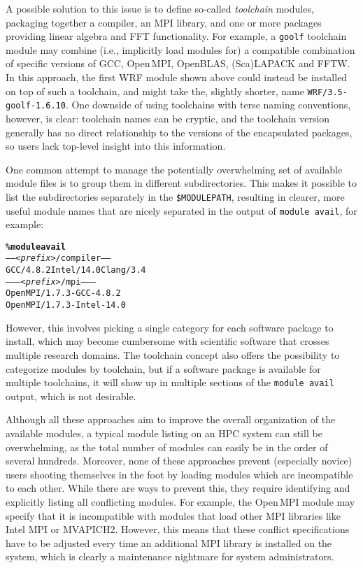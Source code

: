 A possible solution to this issue is to define so-called \emph{toolchain}
modules, packaging together a compiler, an MPI library, and one or more packages
providing linear algebra and FFT functionality. For example, a \texttt{\small goolf}
toolchain module may combine (i.e., implicitly load modules for) a compatible combination of specific versions of GCC,
Open\,MPI, OpenBLAS, (Sca)LAPACK and FFTW. In this approach, the
first WRF module shown above could instead be installed on top of such a toolchain,
and might take the, slightly shorter, name \texttt{\small WRF/3.5-goolf-1.6.10}.
One downside of using toolchains with terse naming conventions, however, is clear: toolchain names can be cryptic, and the toolchain version generally has no direct relationship to the versions of the encapsulated packages, so users lack top-level insight into 
this information.

One common attempt to manage the potentially overwhelming set of available
module files is to group them in different subdirectories. This makes 
it possible to list the subdirectories separately in the
\texttt{\small\$MODULEPATH}, resulting in clearer, more useful
 module names that are
nicely separated in the output of
\texttt{\small module avail}, for example:
{\small
\begin{alltt}
    \textbf{\% module avail}
    ----- \emph{<prefix>}/compiler -----
    GCC/4.8.2   Intel/14.0  Clang/3.4
    -------- \emph{<prefix>}/mpi --------
    OpenMPI/1.7.3-GCC-4.8.2
    OpenMPI/1.7.3-Intel-14.0\
\end{alltt}
}
\noindent
However, this involves picking a single category for each software package to
install, which may become cumbersome with scientific software that crosses multiple
research domains. The toolchain concept also offers the possibility to categorize
modules by toolchain, but if a software package is available for multiple
toolchains, it will show up in multiple sections of the \texttt{\small module
avail} output, which is not desirable.


Although all these approaches aim to improve the overall
organization of the available modules, a typical module listing on an HPC
system can still be overwhelming, as the total number of modules can easily
be in the order of several hundreds. Moreover, none of these approaches prevent (especially novice) users shooting themselves in the
foot by loading modules which are incompatible to each other. While
there are ways to prevent this, they require identifying and explicitly listing
all conflicting modules. For example, the Open\,MPI module may
specify that it is incompatible with modules that load other MPI libraries like
Intel MPI or MVAPICH2. However, this means that these conflict specifications have
to be adjusted every time an additional MPI library is installed on the
system, which is clearly a maintenance nightmare for system administrators.

